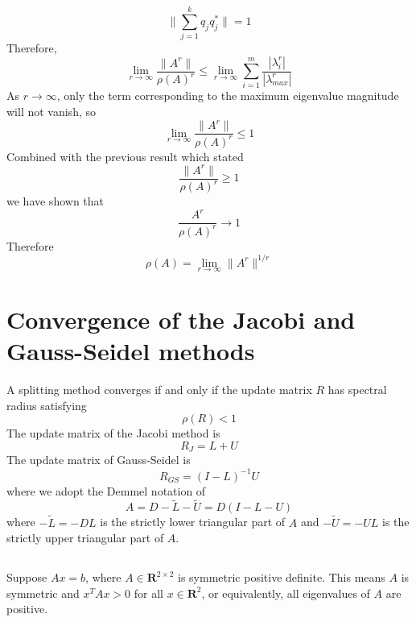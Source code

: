\documentclass[11pt]{article} %
\begin{document}
\begin{equation}
\| \sum_{j=1}^{k} q_{j} q_{j}^* \| =1
\end{equation}
Therefore,
\begin{equation}
\lim_{r \rightarrow \infty} \frac{\| A^r \|}{ \rho(A)^r} \le \lim_{r \rightarrow \infty}  \sum_{i=1}^m \frac{| \lambda_i^r | }{| \lambda_{max}^r |}
\end{equation}
As $r \rightarrow \infty$, only the term corresponding to the maximum eigenvalue magnitude will not vanish, so
\begin{equation}
\lim_{r \rightarrow \infty} \frac{\| A^r \|}{ \rho(A)^r} \le 1
\end{equation}
Combined with the previous result which stated
\begin{equation}
 \frac{\| A^r \|}{ \rho(A)^r} \ge 1
\end{equation}
we have shown that
\begin{equation}
\frac{A^r}{\rho(A)^r} \rightarrow 1
\end{equation}
Therefore
\begin{equation}
\boxed{\rho(A) = \lim_{r \rightarrow \infty} \|A^r \|^{1/r} }
\end{equation}
\section{Convergence of the Jacobi and Gauss-Seidel methods}
A splitting method converges if and only if the update matrix $R$ has spectral radius satisfying
\begin{equation}
 \rho(R) < 1 
\end{equation}
The update matrix of the Jacobi method is 
\begin{equation}
R_J = L + U
\end{equation}
The update matrix of Gauss-Seidel is
\begin{equation}
R_{GS} = (I-L)^{-1} U
\end{equation}
where we adopt the Demmel notation of 
\begin{equation}
A = D - \tilde{L} - \tilde{U} = D(I - L - U )
\end{equation}
where $-\tilde{L} = - D L $ is the strictly lower triangular part of $A$ and $-\tilde{U} = -UL$ is the strictly upper triangular part of $A$.
\subsection{} %
Suppose $A x = b$, where $A \in \mathbf{R}^{2 \times 2}$ is symmetric positive definite. This means $A$ is symmetric and $x^T A x > 0$ for all $x \in \mathbf{R}^2$, or equivalently, all eigenvalues of $A$ are positive.
\end{document}
